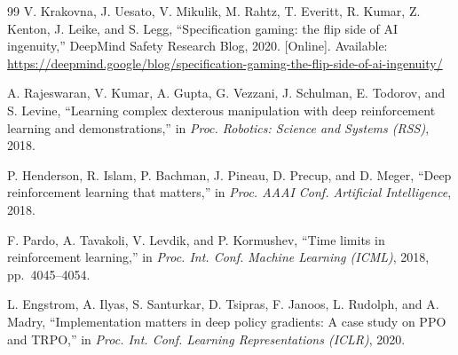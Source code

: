 \documentclass[conference]{IEEEtran}
\begin{document}
\begin{thebibliography}{99}
 V. Krakovna, J. Uesato, V. Mikulik,
M. Rahtz, T. Everitt, R. Kumar, Z. Kenton, J. Leike, and
S. Legg, ``Specification gaming: the flip side of AI
ingenuity,'' DeepMind Safety Research Blog, 2020. [Online].
Available: \url{https://deepmind.google/blog/specification-gaming-the-flip-side-of-ai-ingenuity/}

 A. Rajeswaran, V. Kumar, A. Gupta, G. Vezzani,
J. Schulman, E. Todorov, and S. Levine, ``Learning complex
dexterous manipulation with deep reinforcement learning and
demonstrations,'' in \emph{Proc. Robotics: Science and Systems
(RSS)}, 2018.

 P. Henderson, R. Islam, P. Bachman,
J. Pineau, D. Precup, and D. Meger, ``Deep reinforcement
learning that matters,'' in \emph{Proc. AAAI Conf. Artificial
Intelligence}, 2018.

 F. Pardo, A. Tavakoli, V. Levdik, and
P. Kormushev, ``Time limits in reinforcement learning,'' in
\emph{Proc. Int. Conf. Machine Learning (ICML)}, 2018,
pp.~4045--4054.

 L. Engstrom, A. Ilyas, S. Santurkar,
D. Tsipras, F. Janoos, L. Rudolph, and A. Madry,
``Implementation matters in deep policy gradients: A case
study on PPO and TRPO,'' in \emph{Proc. Int. Conf. Learning
Representations (ICLR)}, 2020.

\end{thebibliography}
\end{document}
